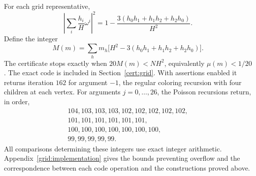 For each grid representative,
\[
 \left|\sum_i\frac{h_i}{H}\omega^i\right|^2
   =1-\frac{3(h_0h_1+h_1h_2+h_2h_0)}{H^2}.
\]
Define the integer
\begin{equation}
 M(m)=\sum_hm_h\bigl[H^2-3(h_0h_1+h_1h_2+h_2h_0)\bigr].
 \label{grid:moment}
\end{equation}
The certificate stops exactly when $20M(m)<NH^2$, equivalently
$\mu(m)<1/20$.  The exact code is included in
Section~\ref{cert:grid}.  With assertions enabled it returns iteration
$162$ for argument $-1$, the regular coloring recursion with four children at each vertex.
For arguments $j=0,\ldots,26$, the Poisson recursions return, in order,
\begin{equation}
\begin{gathered}
104,103,103,103,102,102,102,102,102,\\
101,101,101,101,101,101,\\
100,100,100,100,100,100,100,\\
99,99,99,99,99.
\end{gathered}
\label{grid:outputs}
\end{equation}
All comparisons determining these integers use exact integer arithmetic.
Appendix~\ref{grid:implementation} gives the bounds preventing overflow
and the correspondence between each code operation and the constructions
proved above.

